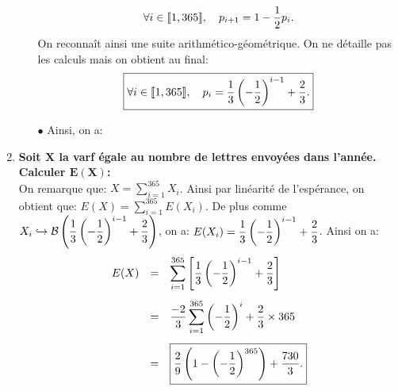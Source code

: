 \documentclass[a4paper, 11pt,reqno]{article}
\begin{document}
\begin{correction}
\begin{enumerate}
\begin{itemize}
				      $$\forall i\in\llbracket  1,365\rrbracket,\quad p_{i+1}=1-\displaystyle\frac{1}{2} p_i.$$
				      On reconna\^{i}t ainsi une suite arithm\'etico-g\'eom\'etrique. On ne d\'etaille pas les calculs mais on obtient au final:
				      $$\fbox{$\forall i\in\llbracket  1,365\rrbracket,\quad p_{i}=\displaystyle\frac{1}{3}\left( -\displaystyle\frac{1}{2} \right)^{i-1}+\displaystyle\frac{2}{3}.$}$$
			      \item[$\bullet$] Ainsi, on a: 
		      \end{itemize}
		\item \textbf{Soit $\mathbf{X}$ la varf \'egale au nombre de lettres envoy\'ees dans l'ann\'ee. Calculer $\mathbf{E(X)}$:}\\
		      \noindent On remarque que: $X=\sum\limits_{i=1}^{365} X_i$. Ainsi par lin\'earit\'e de l'esp\'erance, on obtient que:
		      $E(X)=\sum\limits_{i=1}^{365} E(X_i)$. De plus comme $X_i\hookrightarrow \mathcal{B}\left( \displaystyle\frac{1}{3}\left( -\displaystyle\frac{1}{2} \right)^{i-1}+\displaystyle\frac{2}{3} \right)$, on a: $E(X_i)=\displaystyle\frac{1}{3}\left( -\displaystyle\frac{1}{2} \right)^{i-1}+\displaystyle\frac{2}{3} $. Ainsi on a:
		      $$\begin{array}{lll}
				      E(X) & = & \ddp\sum\limits_{i=1}^{365} \left\lbrack\ddp\frac{1}{3}\left( -\ddp\demi \right)^{i-1}+\ddp\frac{2}{3} \right\rbrack\vsec \\
				           & = & \ddp\frac{-2}{3} \sum\limits_{i=1}^{365} \left( -\ddp\demi \right)^{i}+\ddp\frac{2}{3} \times 365\vsec                    \\
				           & = & \fbox{$ \ddp\frac{2}{9}\left( 1-\left(  -\ddp\demi\right)^{365}   \right)+\ddp\frac{730}{3}   .$}
			      \end{array}$$
	\end{enumerate}
\end{correction}
\end{document}
